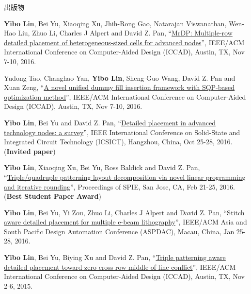 \begin{rSection}{出版物}
\begin{description}[font=\normalfont, rightmargin=2em]
{}
            

\item[{[C8]}]{
        \textbf{Yibo Lin}, Bei Yu, Xiaoqing Xu, Jhih-Rong Gao, Natarajan Viswanathan, Wen-Hao Liu, Zhuo Li, Charles J Alpert and David Z. Pan, 
    ``\href{http://dx.doi.org/10.1145/2966986.2967055}{MrDP: Multiple-row detailed placement of heterogeneous-sized cells for advanced nodes}'', 
    IEEE/ACM International Conference on Computer-Aided Design (ICCAD), Austin, TX, Nov 7-10, 2016.
    
}
            

\item[{[C7]}]{
        Yudong Tao, Changhao Yan, \textbf{Yibo Lin}, Sheng-Guo Wang, David Z. Pan and Xuan Zeng, 
    ``\href{http://dx.doi.org/10.1145/2966986.2966994}{A novel unified dummy fill insertion framework with SQP-based optimization method}'', 
    IEEE/ACM International Conference on Computer-Aided Design (ICCAD), Austin, TX, Nov 7-10, 2016.
    
}
            

\item[{[C6]}]{
        \textbf{Yibo Lin}, Bei Yu and David Z. Pan, 
    ``\href{https://doi.org/10.1109/ICSICT.2016.7999056}{Detailed placement in advanced technology nodes: a survey}'', 
    IEEE International Conference on Solid-State and Integrated Circuit Technology (ICSICT), Hangzhou, China, Oct 25-28, 2016.
    (\textbf{Invited paper})
}
            

\item[{[C5]}]{
        \textbf{Yibo Lin}, Xiaoqing Xu, Bei Yu, Ross Baldick and David Z. Pan, 
    ``\href{http://dx.doi.org/10.1117/12.2218628}{Triple/quadruple patterning layout decomposition via novel linear programming and iterative rounding}'', 
    Proceedings of SPIE, San Jose, CA, Feb 21-25, 2016.
    (\textbf{Best Student Paper Award})
}
            

\item[{[C4]}]{
        \textbf{Yibo Lin}, Bei Yu, Yi Zou, Zhuo Li, Charles J Alpert and David Z. Pan, 
    ``\href{http://ieeexplore.ieee.org/xpl/articleDetails.jsp?arnumber=7428009}{Stitch aware detailed placement for multiple e-beam lithography}'', 
    IEEE/ACM Asia and South Pacific Design Automation Conference (ASPDAC), Macau, China, Jan 25-28, 2016.
    
}
            

\item[{[C3]}]{
        \textbf{Yibo Lin}, Bei Yu, Biying Xu and David Z. Pan, 
    ``\href{http://dl.acm.org/citation.cfm?id=2840875}{Triple patterning aware detailed placement toward zero cross-row middle-of-line conflict}'', 
    IEEE/ACM International Conference on Computer-Aided Design (ICCAD), Austin, TX, Nov 2-6, 2015.
    
}
\end{description}
\end{rSection}

